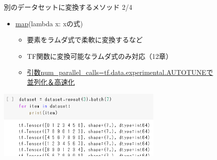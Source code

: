 \documentclass[aspectratio=169, dvipdfmx, 14pt, xcolor={svgnames,dvipsnames}, t]{beamer}
\begin{document}

\begin{frame}{別のデータセットに変換するメソッド 2/4}\label{ux5225ux306eux30c7ux30fcux30bfux30bbux30c3ux30c8ux306bux5909ux63dbux3059ux308bux30e1ux30bdux30c3ux30c9-24}

  \begin{itemize}
    \tightlist
    \item
          \href{https://qiita.com/conf8o/items/0cb02bc504b51af09099}{map}(lambda
          x: xの式)

          \begin{itemize}
            \tightlist
            \item
                  \alert{要素をラムダ式で柔軟に変換する}など
            \item
                  TF関数に変換可能なラムダ式のみ対応（12章）
            \item
                  \href{https://tensorflow.classcat.com/2019/03/23/tf20-alpha-guide-data-performance/}{引数num\_parallel\_calls=tf.data.experimental.AUTOTUNEで\\並列化＆高速化}
          \end{itemize}
  \end{itemize}
  \centering
  \includegraphics[width=230pt]{img/hands-on-ml_13-1-1_2.png}
\end{frame}

\end{document}
